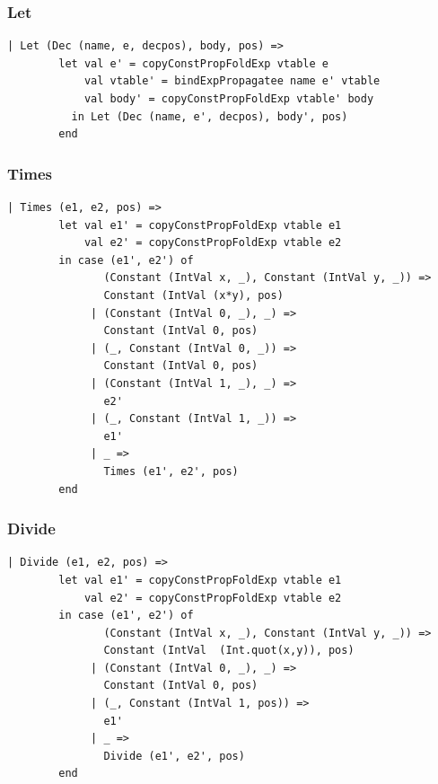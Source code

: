 \documentclass[11pt]{article}
\begin{document}
    \subsubsection{Let} \label{ccpflet}
    \begin{lstlisting}[basicstyle=\small]
      | Let (Dec (name, e, decpos), body, pos) =>
        let val e' = copyConstPropFoldExp vtable e
            val vtable' = bindExpPropagatee name e' vtable
            val body' = copyConstPropFoldExp vtable' body
          in Let (Dec (name, e', decpos), body', pos)
        end
    \end{lstlisting}

    \subsubsection{Times} \label{ccpftimes}
    \begin{lstlisting}[basicstyle=\small]
      | Times (e1, e2, pos) =>
        let val e1' = copyConstPropFoldExp vtable e1
            val e2' = copyConstPropFoldExp vtable e2
        in case (e1', e2') of
               (Constant (IntVal x, _), Constant (IntVal y, _)) =>
               Constant (IntVal (x*y), pos)
             | (Constant (IntVal 0, _), _) =>
               Constant (IntVal 0, pos)
             | (_, Constant (IntVal 0, _)) =>
               Constant (IntVal 0, pos)
             | (Constant (IntVal 1, _), _) =>
               e2'
             | (_, Constant (IntVal 1, _)) =>
               e1'
             | _ =>
               Times (e1', e2', pos)
        end
    \end{lstlisting}

    \subsubsection{Divide} \label{ccpfdiv}
    \begin{lstlisting}[basicstyle=\small]
      | Divide (e1, e2, pos) =>
        let val e1' = copyConstPropFoldExp vtable e1
            val e2' = copyConstPropFoldExp vtable e2
        in case (e1', e2') of
               (Constant (IntVal x, _), Constant (IntVal y, _)) =>
               Constant (IntVal  (Int.quot(x,y)), pos)
             | (Constant (IntVal 0, _), _) =>
               Constant (IntVal 0, pos)
             | (_, Constant (IntVal 1, pos)) =>
               e1'
             | _ =>
               Divide (e1', e2', pos)
        end
    \end{lstlisting}
\end{document}
